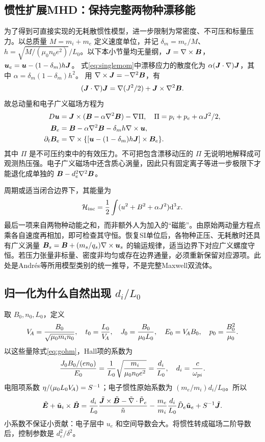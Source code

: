 \documentclass[UTF8,a4paper,11pt,openany,fontset=fandol]{ctexbook}
\begin{document}
\subsection{惯性扩展MHD：保持完整两物种漂移能}
为了得到可直接实现的无耗散惯性模型，进一步限制为常密度、不可压和标量压力。以总质量 $M=m_i+m_e$ 定义速度单位，并记 $\delta_m=m_e/M$、$h=\sqrt{M/(\mu_0n_0e^2)}/L_0$。以下本小节量均无量纲，$\bm{J}=\nabla\times\bm{B}$，$\bm{u}_e=\bm{u}-(1-\delta_m)h\bm{J}$。
式\eqref{eq:singlemom}中漂移应力的散度化为
$\alpha(\bm{J}\cdot\nabla)\bm{J}$，其中 $\alpha=\delta_m(1-\delta_m)h^2$。
用 $\nabla\times\bm{J}=-\nabla^2\bm{B}$，有
\begin{equation}
(\bm{J}\cdot\nabla)\bm{J}=\nabla(J^2/2)+\bm{J}\times\nabla^2\bm{B}.
\end{equation}
故总动量和电子广义磁场方程为
\begin{align}
D\bm{u}&=\bm{J}\times(\bm{B}-\alpha\nabla^2\bm{B})-\nabla\Pi,
\quad\Pi=p_i+p_e+\alpha J^2/2,\\
\bm{B}_e&=\bm{B}-\alpha\nabla^2\bm{B}-\delta_mh\nabla\times\bm{u},\\
\partial_t\bm{B}_e&=\nabla\times\{[\bm{u}-(1-\delta_m)h\bm{J}]\times\bm{B}_e\}.
\end{align}
其中 $\Pi$ 是不可压约束中的有效压力。不可把包含漂移动压的 $\Pi$ 无说明地解释成可观测热压强。电子广义磁场中还含质心涡量，因此只有固定离子等进一步极限下才能退化成单独的 $\bm{B}-d_e^2\nabla^2\bm{B}$。

周期或适当闭合边界下，其能量为
\begin{equation}
\mathcal H_{\rm inc}={1\over2}\int(u^2+B^2+\alpha J^2)\mathrm d^3x.
\end{equation}
最后一项来自两物种动能之和，而非额外人为加入的“磁能”。由原始两动量方程点乘各自速度再相加，即可检查其守恒。恢复SI单位后，各物种正压、无耗散时还具有广义涡量
$\bm{B}_s=\bm{B}+(m_s/q_s)\nabla\times\bm{u}_s$ 的输运规律，适当边界下对应广义螺度守恒。若压力张量非标量、密度非均匀或存在边界通量，必须重新保留对应源项。此处是Andr\'es等所用模型类别的统一推导，不是完整Maxwell双流体。\citep{Andres2014,Andres2016}

\subsection{归一化为什么自然出现 $d_i/L_0$}
取 $B_0,n_0,L_0$，定义
\begin{equation}V_{\!A}={B_0\over\sqrt{\mu_0m_in_0}},\quad t_0={L_0\over V_{\!A}},\quad
J_0={B_0\over\mu_0L_0},\quad E_0=V_{\!A} B_0,\quad p_0={B_0^2\over\mu_0}.
\end{equation}
以这些量除式\eqref{eq:gohm}，Hall项的系数为
\begin{equation}{J_0B_0/(en_0)\over E_0}={1\over L_0}\sqrt{m_i\over\mu_0n_0e^2}={d_i\over L_0},\quad d_i={c\over\omega_{pi}}.
\end{equation}
电阻项系数 $\eta/(\mu_0L_0V_{\!A})=S^{-1}$；电子惯性原始系数为 $(m_e/m_i)d_i/L_0$。所以
\begin{equation}\tilde{\bm{E}}+\tilde{\bm{u}}_i\times\tilde{\bm{B}}={d_i\over L_0}{\tilde{\bm{J}}\times\tilde{\bm{B}}-\tilde{\nabla}\cdot\tilde{\mathsf P}_e\over\tilde n}
-{m_e\over m_i}{d_i\over L_0}\tilde D_e\tilde{\bm{u}}_e+S^{-1}\tilde{\bm{J}}.
\end{equation}
小系数不保证小贡献：电子层中 $u_e$ 和空间导数会大。将惯性转成磁场二阶导数后，控制参数是 $d_e^2/\delta^2$。
\end{document}
